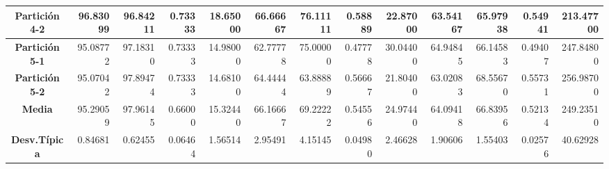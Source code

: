 \documentclass[a4paper,11pt]{article}
\begin{document}
\begin{table}[H]
\begin{adjustbox}{width=1.1\textwidth}
\begin{tabular}{|c|r|r|r|r|r|r|r|r|r|r|r|r|}
  \textbf{Partición 4-2} & 96.83099 & 96.84211 & 0.73333 & 18.65000 & 66.66667 & 76.11111 & 0.58889 & 22.87000 & 63.54167 & 65.97938 & 0.54941 & 213.47700 \\ \hline
  \textbf{Partición 5-1} & 95.08772 & 97.18310 & 0.73333 & 14.98000 & 62.77778 & 75.00000 & 0.47778 & 30.04400 & 64.94845 & 66.14583 & 0.49407 & 247.84800 \\ \hline
  \textbf{Partición 5-2} & 95.07042 & 97.89474 & 0.73333 & 14.68100 & 64.44444 & 63.88889 & 0.56667 & 21.80400 & 63.02083 & 68.55670 & 0.55731 & 256.98700 \\ \hline
  \textbf{Media} & 95.29059 & 97.96145 & 0.66000 & 15.32440 & 66.16667 & 69.22222 & 0.54556 & 24.97440 & 64.09418 & 66.83956 & 0.52134 & 249.23510 \\ \hline
  \textbf{Desv.Típica} & 0.84681 & 0.62455 & 0.06464 & 1.56514 & 2.95491 & 4.15145 & 0.04980 & 2.46628 & 1.90606 & 1.55403 & 0.02576 & 40.62928 \\ \hline
  \end{tabular}
  \end{adjustbox}
  \label{}
  \end{table}
  
\end{document}
